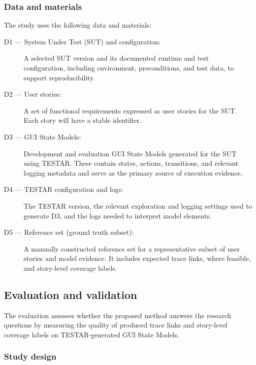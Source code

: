 \subsubsection{Data and materials}
\label{subsubsec:data-materials}

The study uses the following data and materials:

\begin{description}
    \item[D1 --- System Under Test (SUT) and configuration:]
    A selected SUT version and its documented runtime and test configuration, including environment, preconditions, and test data, to support reproducibility.

    \item[D2 --- User stories:]
    A set of functional requirements expressed as user stories for the SUT. Each story will have a stable identifier.

    \item[D3 --- GUI State Models:]
    Development and evaluation GUI State Models generated for the SUT using TESTAR. These contain states, actions, transitions, and relevant logging metadata and serve as the primary source of execution evidence.

    \item[D4 --- TESTAR configuration and logs:]
    The TESTAR version, the relevant exploration and logging settings used to generate D3, and the logs needed to interpret model elements.

    \item[D5 --- Reference set (ground truth subset):]
    A manually constructed reference set for a representative subset of user stories and model evidence. It includes expected trace links, where feasible, and story-level coverage labels.
\end{description}






\subsection{Evaluation and validation}
\label{subsec:evaluation-validation}

The evaluation assesses whether the proposed method answers the research questions by measuring the quality of produced trace links and story-level coverage labels on TESTAR-generated GUI State Models.

\subsubsection{Study design}

